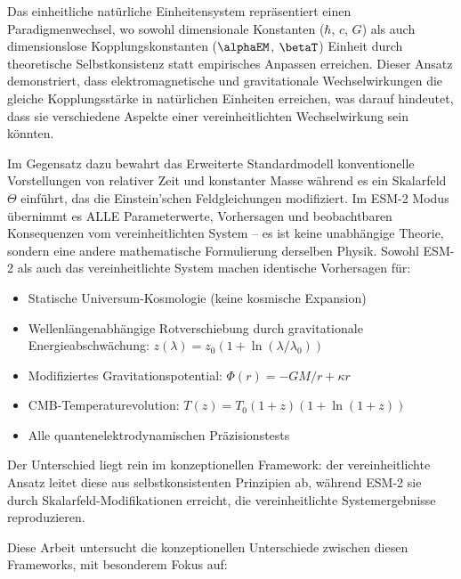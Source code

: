 	Das einheitliche natürliche Einheitensystem repräsentiert einen Paradigmenwechsel, wo sowohl dimensionale Konstanten ($\hbar$, $c$, $G$) als auch dimensionslose Kopplungskonstanten ($\alphaEM$, $\betaT$) Einheit durch theoretische Selbstkonsistenz statt empirisches Anpassen erreichen. Dieser Ansatz demonstriert, dass elektromagnetische und gravitationale Wechselwirkungen die gleiche Kopplungsstärke in natürlichen Einheiten erreichen, was darauf hindeutet, dass sie verschiedene Aspekte einer vereinheitlichten Wechselwirkung sein könnten.
	
	Im Gegensatz dazu bewahrt das Erweiterte Standardmodell konventionelle Vorstellungen von relativer Zeit und konstanter Masse während es ein Skalarfeld $\Theta$ einführt, das die Einstein'schen Feldgleichungen modifiziert. Im ESM-2 Modus übernimmt es ALLE Parameterwerte, Vorhersagen und beobachtbaren Konsequenzen vom vereinheitlichten System – es ist keine unabhängige Theorie, sondern eine andere mathematische Formulierung derselben Physik. Sowohl ESM-2 als auch das vereinheitlichte System machen identische Vorhersagen für:
	
	\begin{itemize}
		\item Statische Universum-Kosmologie (keine kosmische Expansion)
		\item Wellenlängenabhängige Rotverschiebung durch gravitationale Energieabschwächung: $z(\lambda) = z_0(1 + \ln(\lambda/\lambda_0))$
		\item Modifiziertes Gravitationspotential: $\Phi(r) = -GM/r + \kappa r$
		\item CMB-Temperaturevolution: $T(z) = T_0(1+z)(1+\ln(1+z))$
		\item Alle quantenelektrodynamischen Präzisionstests
	\end{itemize}
	
	Der Unterschied liegt rein im konzeptionellen Framework: der vereinheitlichte Ansatz leitet diese aus selbstkonsistenten Prinzipien ab, während ESM-2 sie durch Skalarfeld-Modifikationen erreicht, die vereinheitlichte Systemergebnisse reproduzieren.
	
	Diese Arbeit untersucht die konzeptionellen Unterschiede zwischen diesen Frameworks, mit besonderem Fokus auf:
	
